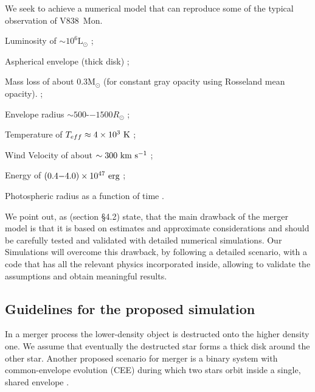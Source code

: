 \documentclass[modern]{aastex62}
\newcommand{\Lsun}{\mathrm{L_\odot}}
\newcommand{\Msun}{\mathrm{M}_\odot}
\def \kms{~\rm{km~s^{-1}}}
\def \K{~\rm{K}}
\def \erg{~\rm{erg}}
\begin{document}
We seek to achieve a numerical model that can reproduce some of the typical observation of V838~Mon.
\begin{enumerate*}[label={(\alph*)}]
\item Luminosity of $\sim 10^6 \Lsun$ \citep{2005A&A...436.1009T};
\item Aspherical envelope (thick disk) \citep{2005ApJ...622L.137L};
\item Mass loss of about $0.3 \Msun$ (for constant gray opacity using Rosseland mean opacity). \citep{2007ASPC..363..161H,2007ASPC..363...13M};
\item Envelope radius $\sim 500$-−$1500R_\odot$ \citep{2007ASPC..363..280S};
\item Temperature of $T_{eff} \approx 4\times10^3\K$ \citep{2005A&A...436.1009T,2007ASPC..363..225P};
\item Wind Velocity of about $\sim 300 \kms$ \citep{2006A&A...451..223T,2007ASPC..363...13M};
\item Energy of $(0.4{-}4.0) \times 10^{47} \erg $ \citep{2005A&A...436.1009T};
\item Photospheric radius as a function of time \citep{2005A&A...436.1009T}.
\end{enumerate*}



We point out, as \cite{2006A&A...451..223T} (section \S4.2) state, that the main drawback of the merger model is that it is based
on estimates and approximate considerations \citep[see also][]{2007ASPC..363..280S}
and should be carefully tested and validated with detailed numerical simulations.
Our Simulations will overcome this drawback, by following a detailed scenario, with a code that has all the relevant physics incorporated inside, allowing to validate the assumptions and obtain meaningful results.


\subsection{Guidelines for the proposed simulation}

In a merger process the lower-density object is destructed onto the higher density one. We assume that eventually the destructed star forms a thick disk around the other star. 
Another proposed scenario for merger is a binary system with common-envelope evolution (CEE) during which two stars orbit inside a single, shared envelope \citep[see][and within]{2013A&ARv..21...59I}.
\end{document}
